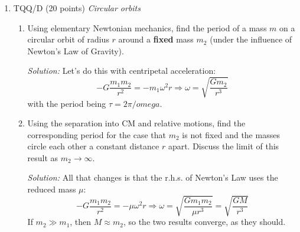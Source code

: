 \documentclass[12pt]{article}
\newcommand{\soln}[2] {\textit{Solution:} #2}
\begin{document}
\begin{enumerate}
            \soln{15em}
            {
                  Given
                  $$\mathcal{L} = \frac{1}{2}\mu \dot{\vec r}^2 + U(r)$$
                  We directly find $p_x = \partial\mathcal{L}/\partial \dot x = \mu \dot x$, and the same for $y$ and $z$, so indeed, $\vec p = \mu \dot{\vec r}$.

                  Since we already know that in the CM frame, $\vec r_1 = \frac{m_2}{M} \vec r$, we can find that
                  $$\vec p_1 = m_1 \dot{\vec r}_1 = \frac{m_1 m_2}{M} \dot{\vec r} = \mu \dot{\vec r} = \vec p$$
                  and a from $\vec r_2 = -\frac{m_1}{M} \vec r$, $\vec p_2 = - \vec p$.
            }

            \clearpage
      \item TQQ/D (20 points) \textit{Circular orbits}

            \begin{enumerate}
                  \item
                        Using elementary Newtonian mechanics, find the period of a mass $m$ on a circular orbit of radius $r$ around a \textbf{fixed} mass $m_2$ (under the influence of Newton's Law of Gravity).

                        \soln{12em}
                        {
                              Let's do this with centripetal acceleration:
                              $$
                                    -G \frac{m_1 m_2}{r^2} = -m_1 \omega^2 r \Longrightarrow \omega = \sqrt{\frac{Gm_2}{r^3}}
                              $$
                              with the period being $\tau = 2\pi/omega$.
                        }

                  \item
                        Using the separation into CM and relative motions, find the corresponding period for the case that $m_2$ is not fixed and the masses circle each other a constant distance $r$ apart. Discuss the limit of this result as $m_2 \rightarrow \infty$.

                        \soln{12em}
                        {
                              All that changes is that the r.h.s. of Newton's Law uses the reduced mass $\mu$:
                              $$
                                    -G \frac{m_1 m_2}{r^2} = -\mu \omega^2 r \Longrightarrow \omega = \sqrt{\frac{Gm_1m_2}{\mu r^3}} = \sqrt{\frac{GM}{r^3}}
                              $$
                              If $m_2 \gg m_1$, then $M \approx m_2$, so the two results converge, as they should.
                        }


\end{enumerate}
\end{enumerate}
\end{document}
